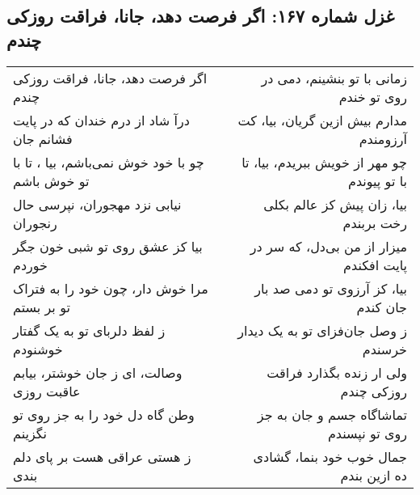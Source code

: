 \begin{center}
\section*{غزل شماره ۱۶۷: اگر فرصت دهد، جانا، فراقت روزکی چندم}
\label{sec:167}
\begin{longtable}{l p{0.5cm} r}
اگر فرصت دهد، جانا، فراقت روزکی چندم
&&
زمانی با تو بنشینم، دمی در روی تو خندم
\\
درآ شاد از درم خندان که در پایت فشانم جان
&&
مدارم بیش ازین گریان، بیا، کت آرزومندم
\\
چو با خود خوش نمی‌باشم، بیا ، تا با تو خوش باشم
&&
چو مهر از خویش ببریدم، بیا، تا با تو پیوندم
\\
نیابی نزد مهجوران، نپرسی حال رنجوران
&&
بیا، زان پیش کز عالم بکلی رخت بربندم
\\
بیا کز عشق روی تو شبی خون جگر خوردم
&&
میزار از من بی‌دل، که سر در پایت افکندم
\\
مرا خوش دار، چون خود را به فتراک تو بر بستم
&&
بیا، کز آرزوی تو دمی صد بار جان کندم
\\
ز لفظ دلربای تو به یک گفتار خوشنودم
&&
ز وصل جان‌فزای تو به یک دیدار خرسندم
\\
وصالت، ای ز جان خوشتر، بیابم عاقبت روزی
&&
ولی ار زنده بگذارد فراقت روزکی چندم
\\
وطن گاه دل خود را به جز روی تو نگزینم
&&
تماشاگاه جسم و جان به جز روی تو نپسندم
\\
ز هستی عراقی هست بر پای دلم بندی
&&
جمال خوب خود بنما، گشادی ده ازین بندم
\\
\end{longtable}
\end{center}
